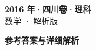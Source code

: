 \documentclass[zihao=-4, a4paper]{ctexart}
\begin{document}
\begin{center}
  {\Large\bfseries 2016 年·四川卷·理科}\\[4pt]
  {\large 数学 · 解析版}
\end{center}
\medskip
{}

\clearpage
{}
\begin{center}{\Large\bfseries 参考答案与详细解析}\end{center}
\medskip

\end{document}
